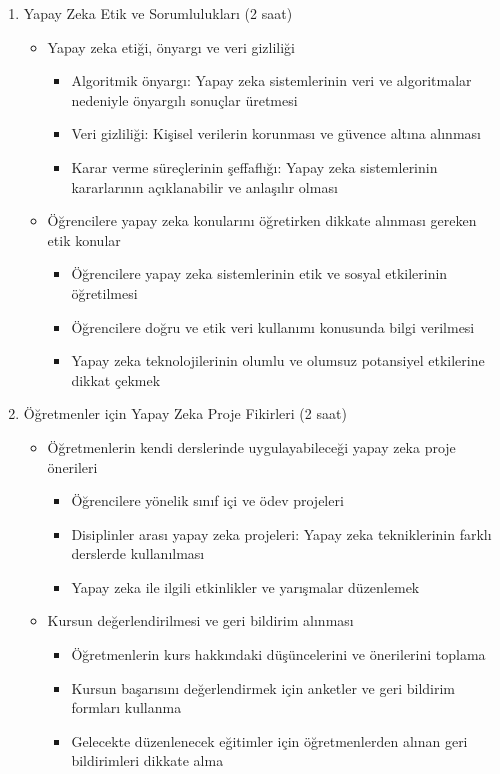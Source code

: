 \documentclass[12pt]{article}
\begin{document}
\begin{enumerate}
    
    \item Yapay Zeka Etik ve Sorumlulukları (2 saat)
    \begin{itemize}
        \item Yapay zeka etiği, önyargı ve veri gizliliği
        \begin{itemize}
            \item Algoritmik önyargı: Yapay zeka sistemlerinin veri ve algoritmalar nedeniyle önyargılı sonuçlar üretmesi
            \item Veri gizliliği: Kişisel verilerin korunması ve güvence altına alınması
            \item Karar verme süreçlerinin şeffaflığı: Yapay zeka sistemlerinin kararlarının açıklanabilir ve anlaşılır olması
        \end{itemize}
        \item Öğrencilere yapay zeka konularını öğretirken dikkate alınması gereken etik konular
        \begin{itemize}
            \item Öğrencilere yapay zeka sistemlerinin etik ve sosyal etkilerinin öğretilmesi
            \item Öğrencilere doğru ve etik veri kullanımı konusunda bilgi verilmesi
            \item Yapay zeka teknolojilerinin olumlu ve olumsuz potansiyel etkilerine dikkat çekmek
        \end{itemize}
    \end{itemize}
    
    \item Öğretmenler için Yapay Zeka Proje Fikirleri (2 saat)
    \begin{itemize}
        \item Öğretmenlerin kendi derslerinde uygulayabileceği yapay zeka proje önerileri
        \begin{itemize}
            \item Öğrencilere yönelik sınıf içi ve ödev projeleri
            \item Disiplinler arası yapay zeka projeleri: Yapay zeka tekniklerinin farklı derslerde kullanılması
            \item Yapay zeka ile ilgili etkinlikler ve yarışmalar düzenlemek
        \end{itemize}
        \item Kursun değerlendirilmesi ve geri bildirim alınması
        \begin{itemize}
            \item Öğretmenlerin kurs hakkındaki düşüncelerini ve önerilerini toplama
            \item Kursun başarısını değerlendirmek için anketler ve geri bildirim formları kullanma
            \item Gelecekte düzenlenecek eğitimler için öğretmenlerden alınan geri bildirimleri dikkate alma
        \end{itemize}
    \end{itemize}


\end{enumerate}
\end{document}
